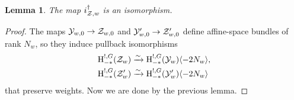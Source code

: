 \documentclass[a4paper,10pt,leqno]{amsart}
\theoremstyle{plain}
\theoremstyle{plain}
\theoremstyle{plain}
\newtheorem{lem}[thm]{Lemma}
\theoremstyle{definition}
\theoremstyle{remark}
\begin{document}
\begin{lem}\label{lem:i-z-pur}
The map $i_{\cal{Z}, w}^\dagger$ is an isomorphism.
\end{lem}

\begin{proof}
The maps $\cal{Y}_{w, 0} \to \cal{Z}_{w, 0}$ and $\cal{Y}'_{w, 0} \to \cal{Z}'_{w, 0}$ define affine-space bundles of rank $N_w$, so they induce pullback isomorphisms
\begin{align}
\ur{H}_{-\ast}^{!, G}(\cal{Z}_w) &\xrightarrow{\sim} \ur{H}_{-\ast}^{!, G}(\cal{Y}_w)\langle -2N_w\rangle,\\
\ur{H}_{-\ast}^{!, G}(\cal{Z}'_w) &\xrightarrow{\sim} \ur{H}_{-\ast}^{!, G}(\cal{Y}'_w)\langle -2N_w\rangle
\end{align}
that preserve weights.
Now we are done by the previous lemma.
\end{proof}
\end{document}
